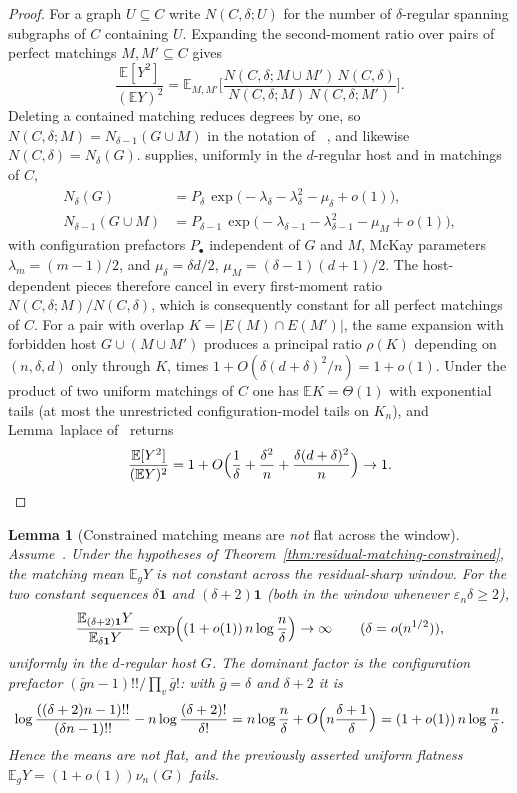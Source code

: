 \documentclass[11pt]{article}
\newtheorem{lemma}[theorem]{Lemma}
\newcommand{\EE}{\mathbb{E}}
\begin{document}
\begin{proof}
For a graph \(U\subseteq C\) write \(N(C,\delta;U)\) for the number of
\(\delta\)-regular spanning subgraphs of \(C\) containing \(U\). Expanding the
second-moment ratio over pairs of perfect matchings \(M,M'\subseteq C\) gives
\[
\frac{\EE[Y^2]}{(\EE Y)^2}
=
\EE_{M,M'}
\Biggl[
\frac{N(C,\delta;M\cup M')\,N(C,\delta)}
{N(C,\delta;M)\,N(C,\delta;M')}
\Biggr].
\]
Deleting a contained matching reduces degrees by one, so
\(N(C,\delta;M)=N_{\delta-1}(G\cup M)\) in the notation of
~\cite[Lemma~free-flat]{PlusOneV1}, and likewise
\(N(C,\delta)=N_\delta(G)\).
\cite[Theorem~4.6]{McK85} supplies, uniformly in the \(d\)-regular host and in
matchings of \(C\),
\begin{align*}
N_\delta(G)
&=
P_\delta\,\exp\bigl(-\lambda_\delta-\lambda_\delta^2-\mu_\delta+o(1)\bigr),
\\
N_{\delta-1}(G\cup M)
&=
P_{\delta-1}\,\exp\bigl(-\lambda_{\delta-1}-\lambda_{\delta-1}^2-\mu_M+o(1)\bigr),
\end{align*}
with configuration prefactors \(P_\bullet\) independent of \(G\) and \(M\),
McKay parameters \(\lambda_m=(m-1)/2\), and
\(\mu_\delta=\delta d/2\), \(\mu_M=(\delta-1)(d+1)/2\).
The host-dependent pieces therefore cancel in every first-moment ratio
\(N(C,\delta;M)/N(C,\delta)\), which is consequently constant for all perfect
matchings of \(C\). For a pair with overlap \(K=\lvert E(M)\cap E(M')\rvert\), the
same expansion with forbidden host \(G\cup(M\cup M')\) produces a principal
ratio \(\rho(K)\) depending on \((n,\delta,d)\) only through \(K\), times
\(1+O(\delta(d+\delta)^2/n)=1+o(1)\). Under the product of two uniform
matchings of \(C\) one has \(\EE K=\Theta(1)\) with exponential tails (at most
the unrestricted configuration-model tails on \(K_n\)), and
Lemma~laplace of~\cite{PlusOneV1} returns
\[
\frac{\EE[Y^2]}{(\EE Y)^2}
=
1+O\Bigl(\frac1\delta+\frac{\delta^2}{n}+\frac{\delta(d+\delta)^2}{n}\Bigr)
\to1.
\]
\end{proof}

\begin{lemma}[Constrained matching means are \emph{not} flat across the window]
\label{lem:residual-window-means}
Assume~\cite[Theorem~4.6]{McK85}. Under the hypotheses of
Theorem~\ref{thm:residual-matching-constrained}, the matching mean \(\EE_g Y\) is not
constant across the residual-sharp window. For the two constant sequences \(\delta\mathbf 1\)
and \((\delta+2)\mathbf 1\) (both in the window whenever \(\varepsilon_n\delta\ge2\)),
\[
\frac{\EE_{(\delta+2)\mathbf 1}Y}{\EE_{\delta\mathbf 1}Y}
=
\exp\Bigl((1+o(1))\,n\log\frac n\delta\Bigr)
\to
\infty
\qquad(\delta=o(n^{1/2})),
\]
uniformly in the \(d\)-regular host \(G\). The dominant factor is the
configuration prefactor \((\bar g n-1)!!/\prod_v\bar g!\): with \(\bar g=\delta\) and
\(\delta+2\) it is
\[
\log\frac{((\delta+2)n-1)!!}{(\delta n-1)!!}-n\log\frac{(\delta+2)!}{\delta!}
=
n\log\frac n\delta+O\Bigl(n\frac{\delta+1}{\delta}\Bigr)
=
(1+o(1))\,n\log\frac n\delta .
\]
Hence the means are \emph{not} flat, and the previously asserted uniform flatness
\(\EE_gY=(1+o(1))\nu_n(G)\) fails.
\end{lemma}
\end{document}
